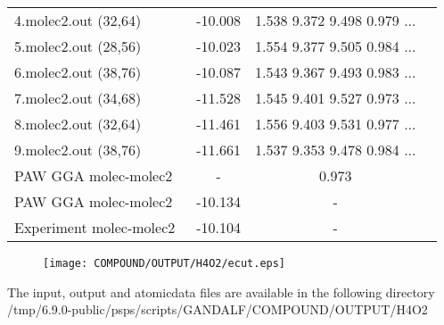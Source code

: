 \documentclass[onecolumn]{revtex4}
\begin{document}
\begin{center}
\begin{tabular}{lccccc}
4.molec2.out (32,64)&\multicolumn{2}{c}{-10.008}&\multicolumn{2}{c}{1.538 9.372 9.498 0.979 ...} \\ 
5.molec2.out (28,56)&\multicolumn{2}{c}{-10.023}&\multicolumn{2}{c}{1.554 9.377 9.505 0.984 ...} \\ 
6.molec2.out (38,76)&\multicolumn{2}{c}{-10.087}&\multicolumn{2}{c}{1.543 9.367 9.493 0.983 ...} \\ 
7.molec2.out (34,68)&\multicolumn{2}{c}{-11.528}&\multicolumn{2}{c}{1.545 9.401 9.527 0.973 ...} \\ 
8.molec2.out (32,64)&\multicolumn{2}{c}{-11.461}&\multicolumn{2}{c}{1.556 9.403 9.531 0.977 ...} \\ 
9.molec2.out (38,76)&\multicolumn{2}{c}{-11.661}&\multicolumn{2}{c}{1.537 9.353 9.478 0.984 ...} \\ 
PAW GGA molec-molec2~\cite{Yang_PRB71_2005} & \multicolumn{2}{c}{-} & \multicolumn{2}{c}{0.973} \\ %
PAW GGA molec-molec2~\cite{Paier_JCP122_2005} & \multicolumn{2}{c}{-10.134} & \multicolumn{2}{c}{-} \\ %
Experiment molec-molec2~\cite{Paier_JCP122_2005} & \multicolumn{2}{c}{-10.104} & \multicolumn{2}{c}{-} \\ %
\hline
\hline
\end{tabular}
\end{center}
\begin{figure}[h] 
\centering 
\texttt{[image: COMPOUND/OUTPUT/H4O2/ecut.eps]}
\end{figure}
\begin{htmlonly} 
The input, output and atomicdata files are available in the following directory 
  {/tmp/6.9.0-public/psps/scripts/GANDALF/COMPOUND/OUTPUT/H4O2} 
\end{htmlonly} 
\newpage
\end{document}
